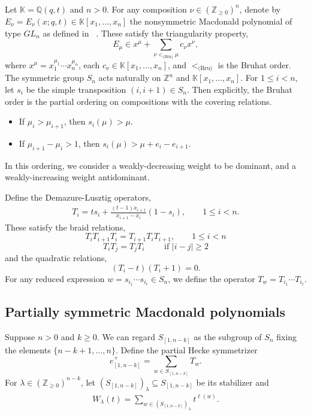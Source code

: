 \documentclass[ALCO]{cedram}
\newcommand{\Q}{\mathbb{Q}}
\newcommand{\Z}{\mathbb{Z}}
\newcommand{\K}{\mathbb{K}}
\newcommand{\en}{e^+_{[1,n-k]}}
\newcommand{\Sn}{S_{[1,n-k]}}
\begin{document}
Let $\K=\Q(q,t)$ and $n>0$. For any composition $\nu\in(\Z_{\ge 0})^n$, denote by $E_\nu =E_\nu(x;q,t)\in \K[x_1,\dotsc,x_n]$ the nonsymmetric Macdonald polynomial of type $GL_n$ as defined in ~\cite{MR2405160}. These satisfy the triangularity property,
\begin{equation}\label{Etriangularity} E_\mu \in x^\mu + \sum_{\nu <_{\text{(Bru)}} \mu} c_\nu x^\nu,\end{equation}
where $x^\mu = x_1^{\mu_1} \dotsm x_n^{\mu_n}$, each $c_\nu \in \K[x_1,\dotsc, x_n]$, and $<_{\text{(Bru)}}$ is the Bruhat order. The symmetric group $S_n$ acts naturally on $\Z^n$ and $\K[x_1,\dotsc,x_n]$. For $1\le i<n$, let $s_i$ be the simple transposition $(i,i+1)\in S_n$. Then explicitly, the Bruhat order is the partial ordering on compositions with the covering relations.
\begin{itemize}
    \item If $\mu_i > \mu_{i+1}$, then $s_i(\mu) > \mu$.
    \item If $\mu_{i+1}-\mu_i > 1$, then $s_i(\mu) > \mu + e_i - e_{i+1}$.
\end{itemize}
In this ordering, we consider a weakly-decreasing weight to be dominant, and a weakly-increasing weight antidominant.

Define the Demazure-Lusztig operators,
\begin{align*}
T_i = ts_i + \frac{(t-1)x_{i+1}}{x_{i+1}-x_i}(1-s_i), \qquad 1\le i<n.
\end{align*}
These satisfy the braid relations,
\begin{equation}\label{braidrelations}T_i T_{i+1} T_i = T_{i+1} T_i T_{i+1}, \qquad 1\leq i < n\end{equation}
\begin{equation} T_i T_j = T_j T_i \qquad \text{ if } |i-j|\geq 2\end{equation}
and the quadratic relations,
\begin{equation}\label{quadratic}
(T_i-t)(T_i+1)=0.
\end{equation}
For any reduced expression $w=s_{i_1}\dotsm s_{i_\ell}\in S_n$, we define the operator $T_w=T_{i_1}\dotsm T_{i_\ell}$. 

\subsection{Partially symmetric Macdonald polynomials}
Suppose $n>0$ and $k\geq 0$. We can regard $\Sn$ as the subgroup of $S_n$ fixing the elements $\{n-k+1,\dotsc,n\}$. Define the partial Hecke symmetrizer
$$
\en=\sum_{w\in \Sn} T_w.
$$
For $\lambda\in(\Z_{\ge 0})^{n-k}$, let $(\Sn)_\lambda\subseteq \Sn$ be its stabilizer and
\begin{align*}
W_\lambda(t)=\sum_{w\in (\Sn)_\lambda} t^{\ell(w)}.
\end{align*}
\end{document}
